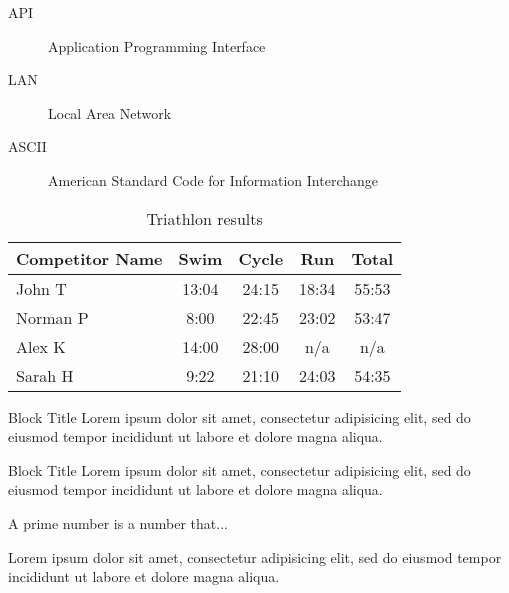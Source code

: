 \documentclass{beamer}
\begin{document}
      \begin{frame}
        \begin{description}
          \item[API] Application Programming Interface
          \item[LAN] Local Area Network
          \item[ASCII] American Standard Code for Information Interchange
          \end{description}
      \end{frame}

      \begin{frame}
        \begin{table}
          \begin{tabular}{l | c | c | c | c }
            Competitor Name & Swim & Cycle & Run & Total \\
            \hline \hline
            John T & 13:04 & 24:15 & 18:34 & 55:53 \\
            Norman P & 8:00 & 22:45 & 23:02 & 53:47\\
            Alex K & 14:00 & 28:00 & n/a & n/a\\
            Sarah H & 9:22 & 21:10 & 24:03 & 54:35
          \end{tabular}
          \caption{Triathlon results}
        \end{table}
      \end{frame}

      \begin{frame}
        \begin{block}{Block Title}
          Lorem ipsum dolor sit amet, consectetur adipisicing elit,
          sed do eiusmod tempor incididunt ut labore et
          dolore magna aliqua.
        \end{block}
        \begin{alertblock}{Block Title}
          Lorem ipsum dolor sit amet, consectetur adipisicing elit,
          sed do eiusmod tempor incididunt ut labore et
          dolore magna aliqua.
        \end{alertblock}
        \begin{definition}
          A prime number is a number that...
        \end{definition}
        \begin{example}
          Lorem ipsum dolor sit amet, consectetur adipisicing elit,
          sed do eiusmod tempor incididunt ut labore et
          dolore magna aliqua.
        \end{example}
      \end{frame}
\end{document}
